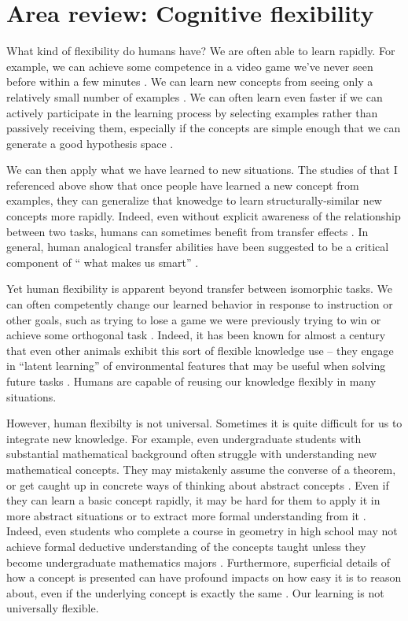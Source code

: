 \documentclass[11pt]{article}
\begin{document}
\section{Area review: Cognitive flexibility}

What kind of flexibility do humans have? We are often able to learn rapidly. For example, we can achieve some competence in a video game we've never seen before within a few minutes \citep{Lake2016}. We can learn new concepts from seeing only a relatively small number of examples \citep[e.g.]{Bourne1970}. We can often learn even faster if we can actively participate in the learning process by selecting examples rather than passively receiving them, especially if the concepts are simple enough that we can generate a good hypothesis space \citep{Markant2014a}. \par
We can then apply what we have learned to new situations. The studies of \citet{Bourne1970} that I referenced above show that once people have learned a new concept from examples, they can generalize that knowedge to learn structurally-similar new concepts more rapidly. Indeed, even without explicit awareness of the relationship between two tasks, humans can sometimes benefit from transfer effects \citep[e.g.]{Day2011}. In general, human analogical transfer abilities have been suggested to be a critical component of `` what makes us smart'' \citep{Gentner2003}. \par
Yet human flexibility is apparent beyond transfer between isomorphic tasks. We can often competently change our learned behavior in response to instruction or other goals, such as trying to lose a game we were previously trying to win or achieve some orthogonal task \citep{Lake2016}. Indeed, it has been known for almost a century that even other animals exhibit this sort of flexible knowledge use -- they engage in ``latent learning'' of environmental features that may be useful when solving future tasks \citep{Blodgett1929}. Humans are capable of reusing our knowledge flexibly in many situations. \par
However, human flexibilty is not universal. Sometimes it is quite difficult for us to integrate new knowledge. For example, even undergraduate students with substantial mathematical background often struggle with understanding new mathematical concepts. They may mistakenly assume the converse of a theorem, or get caught up in concrete ways of thinking about abstract concepts \citep{Hazzan1999}. Even if they can learn a basic concept rapidly, it may be hard for them to apply it in more abstract situations or to extract more formal understanding from it \citep[e.g.]{Lampinen2017b}. Indeed, even students who complete a course in geometry in high school may not achieve formal deductive understanding of the concepts taught unless they become undergraduate mathematics majors \citep{Burger1986}. Furthermore, superficial details of how a concept is presented can have profound impacts on how easy it is to reason about, even if the underlying concept is exactly the same \citep[e.g.]{Kotovsky1985}. Our learning is not universally flexible. \par 
\end{document}
